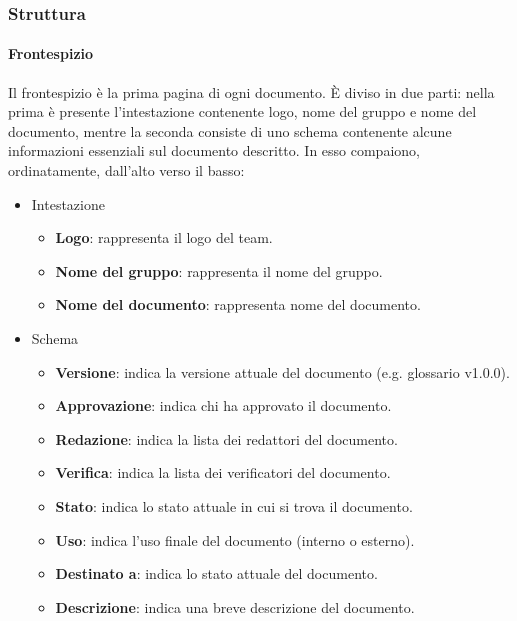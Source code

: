\documentclass[../norme-di-progetto.tex]{subfiles}
\begin{document}
\subsubsection{Struttura}%
\label{subs:struttura}

\paragraph{Frontespizio}%
\label{par:frontespizio}
Il frontespizio è la prima pagina di ogni documento. È diviso in due parti: nella prima è presente l'intestazione contenente logo, nome del gruppo e nome del documento, mentre la seconda consiste di uno schema contenente alcune informazioni essenziali sul documento descritto. In esso compaiono, ordinatamente, dall'alto verso il basso:

\begin{itemize}
  \item Intestazione
  \begin{itemize}
    \item \textbf{Logo}: rappresenta il logo del team.
    \item \textbf{Nome del gruppo}: rappresenta il nome del gruppo.
    \item \textbf{Nome del documento}: rappresenta nome del documento.
  \end{itemize}
  \item Schema
  \begin{itemize}
    \item \textbf{Versione}: indica la versione attuale del documento (e.g. glossario v1.0.0).
    \item \textbf{Approvazione}: indica chi ha approvato il documento.
    \item \textbf{Redazione}: indica la lista dei redattori del documento.
    \item \textbf{Verifica}: indica la lista dei verificatori del documento.
    \item \textbf{Stato}: indica lo stato attuale in cui si trova il documento.
    \item \textbf{Uso}: indica l'uso finale del documento (interno o esterno).
    \item \textbf{Destinato a}: indica lo stato attuale del documento.
    \item \textbf{Descrizione}: indica una breve descrizione del documento.
  \end{itemize}
\end{itemize}
\end{document}
